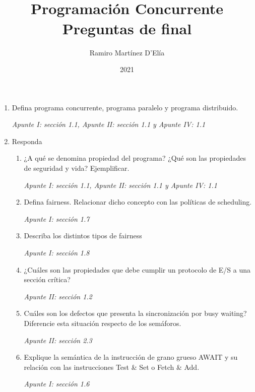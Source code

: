 \documentclass[a4paper, 10pt]{article}
\newenvironment{QandA}{
    \begin{enumerate}\bfseries}
    {\end{enumerate}
}
\newenvironment{answered}{\par\normalfont}{}
\begin{document}
    
\title{
    \\
    Programación Concurrente\\
    \large Preguntas de final
}

\author{Ramiro Martínez D'Elía}
\date{2021}
\maketitle

\noindent%
\begin{QandA}
\item Defina programa concurrente, programa paralelo y programa distribuido.
\begin{answered}
    \emph{Apunte I: sección 1.1, Apunte II: sección 1.1 y Apunte IV: 1.1}
\end{answered}


\item Responda
\begin{enumerate}[label=\alph*)]
\item ¿A qué se denomina propiedad del programa? ¿Qué son las propiedades de seguridad y vida? Ejemplificar.
\begin{answered}
    \emph{Apunte I: sección 1.1, Apunte II: sección 1.1 y Apunte IV: 1.1}
\end{answered}
\item Defina fairness. Relacionar dicho concepto con las políticas de scheduling.
\begin{answered}
    \emph{Apunte I: sección 1.7}
\end{answered}
\item Describa los distintos tipos de fairness
\begin{answered}
    \emph{Apunte I: sección 1.8}
\end{answered}
\item ¿Cuáles son las propiedades que debe cumplir un protocolo de E/S a una sección crítica?
\begin{answered}
    \emph{Apunte II: sección 1.2}
\end{answered}
\item Cuáles son los defectos que presenta la sincronización por busy waiting? Diferencie esta situación respecto de los semáforos.
\begin{answered}
    \emph{Apunte II: sección 2.3}
\end{answered}
\item Explique la semántica de la instrucción de grano grueso  AWAIT y su relación con las instrucciones Test \& Set o Fetch \& Add.
\begin{answered}
    \emph{Apunte I: sección 1.6}
\end{answered}
\end{enumerate}


\end{QandA}
\end{document}
